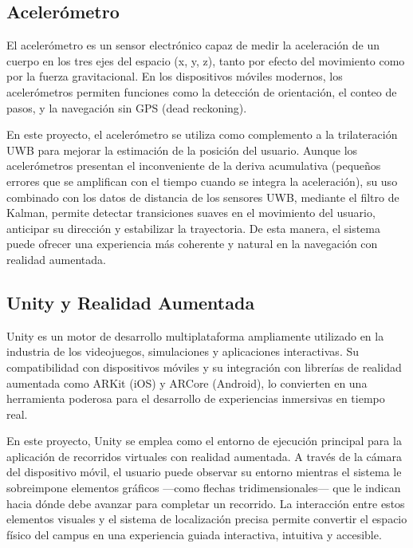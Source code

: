 \documentclass{article}
\begin{document}
\subsection{Acelerómetro}
{\justify El acelerómetro es un sensor electrónico capaz de medir la aceleración de un cuerpo en los tres ejes del espacio (x, y, z), tanto por efecto del movimiento como por la fuerza gravitacional. En los dispositivos móviles modernos, los acelerómetros permiten funciones como la detección de orientación, el conteo de pasos, y la navegación sin GPS (dead reckoning).

En este proyecto, el acelerómetro se utiliza como complemento a la trilateración UWB para mejorar la estimación de la posición del usuario. Aunque los acelerómetros presentan el inconveniente de la deriva acumulativa (pequeños errores que se amplifican con el tiempo cuando se integra la aceleración), su uso combinado con los datos de distancia de los sensores UWB, mediante el filtro de Kalman, permite detectar transiciones suaves en el movimiento del usuario, anticipar su dirección y estabilizar la trayectoria. De esta manera, el sistema puede ofrecer una experiencia más coherente y natural en la navegación con realidad aumentada.}

\subsection{Unity y Realidad Aumentada}
{\justify Unity es un motor de desarrollo multiplataforma ampliamente utilizado en la industria de los videojuegos, simulaciones y aplicaciones interactivas. Su compatibilidad con dispositivos móviles y su integración con librerías de realidad aumentada como ARKit (iOS) y ARCore (Android), lo convierten en una herramienta poderosa para el desarrollo de experiencias inmersivas en tiempo real.

En este proyecto, Unity se emplea como el entorno de ejecución principal para la aplicación de recorridos virtuales con realidad aumentada. A través de la cámara del dispositivo móvil, el usuario puede observar su entorno mientras el sistema le sobreimpone elementos gráficos —como flechas tridimensionales— que le indican hacia dónde debe avanzar para completar un recorrido. La interacción entre estos elementos visuales y el sistema de localización precisa permite convertir el espacio físico del campus en una experiencia guiada interactiva, intuitiva y accesible.}
\end{document}
